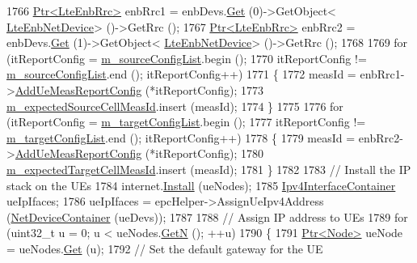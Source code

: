 \begin{DoxyCode}
1766   \hyperlink{classns3_1_1Ptr}{Ptr<LteEnbRrc>} enbRrc1 = enbDevs.\hyperlink{classns3_1_1NetDeviceContainer_a677d62594b5c9d2dea155cc5045f4d0b}{Get} (0)->GetObject<
      \hyperlink{classns3_1_1LteEnbNetDevice}{LteEnbNetDevice}> ()->GetRrc ();
1767   \hyperlink{classns3_1_1Ptr}{Ptr<LteEnbRrc>} enbRrc2 = enbDevs.\hyperlink{classns3_1_1NetDeviceContainer_a677d62594b5c9d2dea155cc5045f4d0b}{Get} (1)->GetObject<
      \hyperlink{classns3_1_1LteEnbNetDevice}{LteEnbNetDevice}> ()->GetRrc ();
1768 
1769   \textcolor{keywordflow}{for} (itReportConfig = \hyperlink{classLteUeMeasurementsHandoverTestCase_a49bb851aed531dfbf9a9e88284c4f0ef}{m\_sourceConfigList}.begin ();
1770        itReportConfig != \hyperlink{classLteUeMeasurementsHandoverTestCase_a49bb851aed531dfbf9a9e88284c4f0ef}{m\_sourceConfigList}.end (); itReportConfig++)
1771     \{
1772       measId = enbRrc1->\hyperlink{classns3_1_1LteEnbRrc_a4b9348b6c39a805cd23d3ed4a5091ae5}{AddUeMeasReportConfig} (*itReportConfig);
1773       \hyperlink{classLteUeMeasurementsHandoverTestCase_aca431e1ebc93460a53628630a534c474}{m\_expectedSourceCellMeasId}.insert (measId);
1774     \}
1775 
1776   \textcolor{keywordflow}{for} (itReportConfig = \hyperlink{classLteUeMeasurementsHandoverTestCase_ab87f6d3138c51c5996947ef91e25a1b8}{m\_targetConfigList}.begin ();
1777        itReportConfig != \hyperlink{classLteUeMeasurementsHandoverTestCase_ab87f6d3138c51c5996947ef91e25a1b8}{m\_targetConfigList}.end (); itReportConfig++)
1778     \{
1779       measId = enbRrc2->\hyperlink{classns3_1_1LteEnbRrc_a4b9348b6c39a805cd23d3ed4a5091ae5}{AddUeMeasReportConfig} (*itReportConfig);
1780       \hyperlink{classLteUeMeasurementsHandoverTestCase_a63388a20a3de7adc15907242f6e4a8bf}{m\_expectedTargetCellMeasId}.insert (measId);
1781     \}
1782 
1783   \textcolor{comment}{// Install the IP stack on the UEs}
1784   internet.\hyperlink{classns3_1_1InternetStackHelper_a6645b412f31283d2d9bc3d8a95cebbc0}{Install} (ueNodes);
1785   \hyperlink{classns3_1_1Ipv4InterfaceContainer}{Ipv4InterfaceContainer} ueIpIfaces;
1786   ueIpIfaces = epcHelper->AssignUeIpv4Address (\hyperlink{classns3_1_1NetDeviceContainer}{NetDeviceContainer} (ueDevs));
1787 
1788   \textcolor{comment}{// Assign IP address to UEs}
1789   \textcolor{keywordflow}{for} (uint32\_t u = 0; u < ueNodes.\hyperlink{classns3_1_1NodeContainer_aed647ac56d0407a7706aba02eb44b951}{GetN} (); ++u)
1790     \{
1791       \hyperlink{classns3_1_1Ptr}{Ptr<Node>} ueNode = ueNodes.\hyperlink{classns3_1_1NodeContainer_a9ed96e2ecc22e0f5a3d4842eb9bf90bf}{Get} (u);
1792       \textcolor{comment}{// Set the default gateway for the UE}

\end{DoxyCode}
